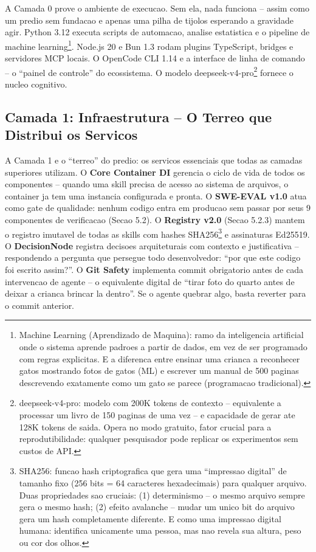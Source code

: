 \documentclass[12pt,a4paper,oneside,sumario=tradicional,chapter=TITLE,section=TITLE,subsection=TITLE,english,brazil]{abntex2}
\begin{document}
A Camada 0 prove o ambiente de execucao. Sem ela, nada funciona -- assim como um predio sem fundacao e apenas uma pilha de tijolos esperando a gravidade agir. Python 3.12 executa scripts de automacao, analise estatistica e o pipeline de machine learning\footnote{Machine Learning (Aprendizado de Maquina): ramo da inteligencia artificial onde o sistema aprende padroes a partir de dados, em vez de ser programado com regras explicitas. E a diferenca entre ensinar uma crianca a reconhecer gatos mostrando fotos de gatos (ML) e escrever um manual de 500 paginas descrevendo exatamente como um gato se parece (programacao tradicional).}. Node.js 20 e Bun 1.3 rodam plugins TypeScript, bridges e servidores MCP locais. O OpenCode CLI 1.14 e a interface de linha de comando -- o ``painel de controle'' do ecossistema. O modelo deepseek-v4-pro\footnote{deepseek-v4-pro: modelo com 200K tokens de contexto -- equivalente a processar um livro de 150 paginas de uma vez -- e capacidade de gerar ate 128K tokens de saida. Opera no modo gratuito, fator crucial para a reprodutibilidade: qualquer pesquisador pode replicar os experimentos sem custos de API.} fornece o nucleo cognitivo.

\subsection{Camada 1: Infraestrutura -- O Terreo que Distribui os Servicos}

A Camada 1 e o ``terreo'' do predio: os servicos essenciais que todas as camadas superiores utilizam. O \textbf{Core Container DI} gerencia o ciclo de vida de todos os componentes -- quando uma skill precisa de acesso ao sistema de arquivos, o container ja tem uma instancia configurada e pronta. O \textbf{SWE-EVAL v1.0} atua como gate de qualidade: nenhum codigo entra em producao sem passar por seus 9 componentes de verificacao (Secao 5.2). O \textbf{Registry v2.0} (Secao 5.2.3) mantem o registro imutavel de todas as skills com hashes SHA256\footnote{SHA256: funcao hash criptografica que gera uma ``impressao digital'' de tamanho fixo (256 bits = 64 caracteres hexadecimais) para qualquer arquivo. Duas propriedades sao cruciais: (1) determinismo -- o mesmo arquivo sempre gera o mesmo hash; (2) efeito avalanche -- mudar um unico bit do arquivo gera um hash completamente diferente. E como uma impressao digital humana: identifica unicamente uma pessoa, mas nao revela sua altura, peso ou cor dos olhos.} e assinaturas Ed25519. O \textbf{DecisionNode} registra decisoes arquiteturais com contexto e justificativa -- respondendo a pergunta que persegue todo desenvolvedor: ``por que este codigo foi escrito assim?''. O \textbf{Git Safety} implementa commit obrigatorio antes de cada intervencao de agente -- o equivalente digital de ``tirar foto do quarto antes de deixar a crianca brincar la dentro''. Se o agente quebrar algo, basta reverter para o commit anterior.
\end{document}
